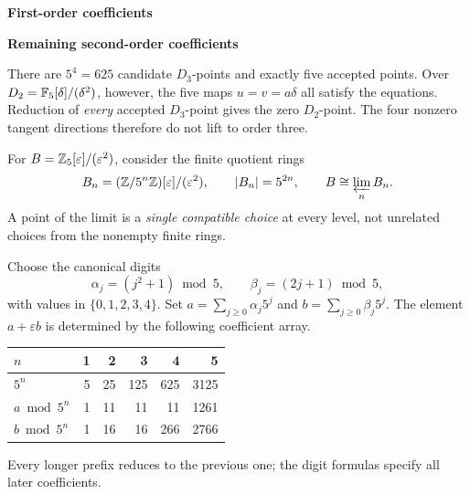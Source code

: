 \begin{minipage}[t]{.48\linewidth}\centering
{\sffamily\small\bfseries First-order coefficients}\par
{}
\end{minipage}\hfill
\begin{minipage}[t]{.48\linewidth}\centering
{\sffamily\small\bfseries Remaining second-order coefficients}\par
{}
\end{minipage}

There are $5^4=625$ candidate $D_3$-points and exactly five accepted points. Over $D_2=\mathbb F_5[\delta]/(\delta^2)$, however, the five maps $u=v=a\delta$ all satisfy the equations. Reduction of \emph{every} accepted $D_3$-point gives the zero $D_2$-point. The four nonzero tangent directions therefore do not lift to order three.


For $B=\mathbb Z_5[\varepsilon]/(\varepsilon^2)$, consider the finite quotient rings
\[
B_n=(\mathbb Z/5^n\mathbb Z)[\varepsilon]/(\varepsilon^2),
\qquad |B_n|=5^{2n},\qquad B\cong\varprojlim_n B_n.
\]
A point of the limit is a \emph{single compatible choice} at every level, not unrelated choices from the nonempty finite rings.

Choose the canonical digits
\[
\alpha_j=(j^2+1)\bmod5,\qquad \beta_j=(2j+1)\bmod5,
\]
with values in $\{0,1,2,3,4\}$. Set $a=\sum_{j\ge0}\alpha_j5^j$ and $b=\sum_{j\ge0}\beta_j5^j$. The element $a+\varepsilon b$ is determined by the following coefficient array.


\begin{center}\small
\begin{tabular}{@{}lrrrrr@{}}\toprule
$n$ & 1 & 2 & 3 & 4 & 5\\\midrule
$5^n$ & 5 & 25 & 125 & 625 & 3125\\
$a\bmod5^n$ & 1 & 11 & 11 & 11 & 1261\\
$b\bmod5^n$ & 1 & 16 & 16 & 266 & 2766\\\bottomrule
\end{tabular}
\end{center}
Every longer prefix reduces to the previous one; the digit formulas specify all later coefficients.

